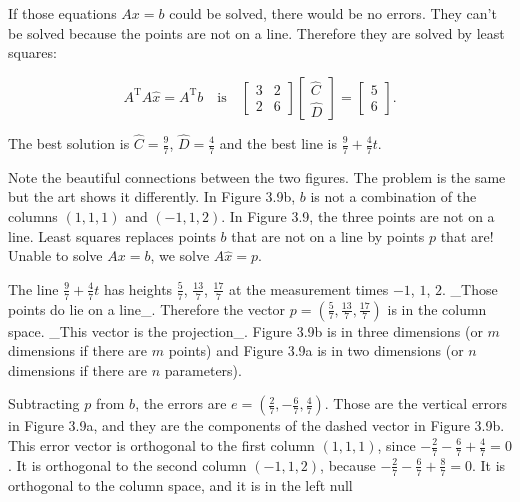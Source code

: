 If those equations \(Ax=b\) could be solved, there would be no errors. They can't be solved because the points are not on a line. Therefore they are solved by least squares:

\[A^{\mathrm{T}}A\widehat{x}=A^{\mathrm{T}}b\quad\text{is}\quad\begin{bmatrix}3&2 \\ 2&6\end{bmatrix}\begin{bmatrix}\widehat{C}\\ \widehat{D}\end{bmatrix}=\begin{bmatrix}5\\ 6\end{bmatrix}.\]

The best solution is \(\widehat{C}=\frac{9}{7}\), \(\widehat{D}=\frac{4}{7}\) and the best line is \(\frac{9}{7}+\frac{4}{7}t\).

Note the beautiful connections between the two figures. The problem is the same but the art shows it differently. In Figure 3.9b, \(b\) is not a combination of the columns \((1,1,1)\) and \((-1,1,2)\). In Figure 3.9, the three points are not on a line. Least squares replaces points \(b\) that are not on a line by points \(p\) that are! Unable to solve \(Ax=b\), we solve \(A\widehat{x}=p\).

The line \(\frac{9}{7}+\frac{4}{7}t\) has heights \(\frac{5}{7}\), \(\frac{13}{7}\), \(\frac{17}{7}\) at the measurement times \(-1\), \(1\), \(2\). _Those points do lie on a line_. Therefore the vector \(p=(\frac{5}{7},\frac{13}{7},\frac{17}{7})\) is in the column space. _This vector is the projection_. Figure 3.9b is in three dimensions (or \(m\) dimensions if there are \(m\) points) and Figure 3.9a is in two dimensions (or \(n\) dimensions if there are \(n\) parameters).

Subtracting \(p\) from \(b\), the errors are \(e=(\frac{2}{7},-\frac{6}{7},\frac{4}{7})\). Those are the vertical errors in Figure 3.9a, and they are the components of the dashed vector in Figure 3.9b. This error vector is orthogonal to the first column \((1,1,1)\), since \(-\frac{2}{7}-\frac{6}{7}+\frac{4}{7}=0\). It is orthogonal to the second column \((-1,1,2)\), because \(-\frac{2}{7}-\frac{6}{7}+\frac{8}{7}=0\). It is orthogonal to the column space, and it is in the left null 